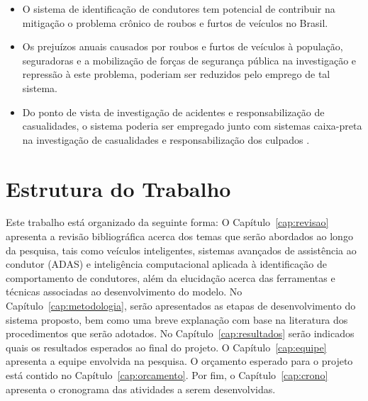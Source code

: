 \begin{itemize}

	\item O sistema de identificação de condutores tem potencial de contribuir na mitigação o problema crônico de roubos e furtos de veículos no Brasil.
	
	\item Os prejuízos anuais causados por roubos e furtos de veículos à população, seguradoras e a mobilização de forças de segurança pública na investigação e repressão à este problema, poderiam ser reduzidos pelo emprego de tal sistema.
	
	\item Do ponto de vista de investigação de acidentes e responsabilização de casualidades, o sistema poderia ser empregado junto com sistemas caixa-preta na investigação de casualidades e responsabilização dos culpados \cite{Barbosa2017}.

\end{itemize}


\section{Estrutura do Trabalho}

Este trabalho está organizado da seguinte forma: O Capítulo~\ref{cap:revisao} apresenta a revisão bibliográfica acerca dos temas que serão abordados ao longo da pesquisa, tais como veículos inteligentes, sistemas avançados de assistência ao condutor (ADAS) e inteligência computacional aplicada à identificação de comportamento de condutores, além da elucidação acerca das ferramentas e técnicas associadas ao desenvolvimento do modelo. No Capítulo~\ref{cap:metodologia}, serão apresentados as etapas de desenvolvimento do sistema proposto, bem como uma breve explanação com base na literatura dos procedimentos que serão adotados. No Capítulo~\ref{cap:resultados} serão indicados quais os resultados esperados ao final do projeto. O Capítulo~\ref{cap:equipe} apresenta a equipe envolvida na pesquisa. O orçamento esperado para o projeto está contido no Capítulo~\ref{cap:orcamento}. Por fim, o Capítulo~\ref{cap:crono} apresenta o cronograma das atividades a serem desenvolvidas.